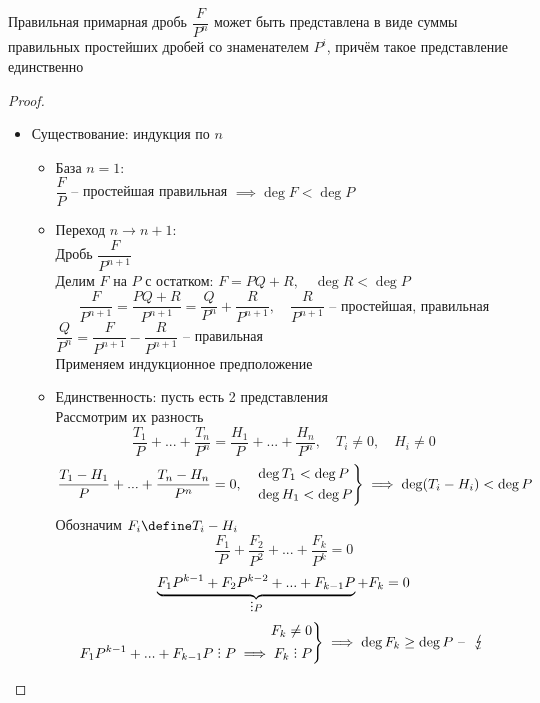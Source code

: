 \begin{lemma}
    Правильная примарная дробь $\dfrac{F}{P^n}$ может быть представлена в виде суммы правильных простейших дробей со знаменателем $P^i$, причём такое представление единственно
\end{lemma}

\begin{proof}
	\hfill
    \begin{itemize}
    	\item Существование: индукция по $n$
        \begin{itemize}
        	\item База $n = 1$: \\
            $\dfrac{F}P$ -- простейшая правильная $\implies \deg F < \deg P$
            \item Переход $n \to n + 1$: \\
            Дробь $\dfrac{F}{P^{n + 1}}$ \\
            Делим $F$ на $P$ с остатком: $F = PQ + R, \quad \deg R < \deg P$
            $$ \frac{F}{P^{n + 1}} = \frac{PQ + R}{P^{n + 1}} = \frac{Q}{P^n} + \frac{R}{P^{n + 1}}, \quad \frac{R}{P^{n + 1}} \text{ -- простейшая, правильная} $$
            $ \dfrac{Q}{P^n} = \dfrac{F}{P^{n + 1}} - \dfrac{R}{P^{n + 1}}$ -- правильная \\
            Применяем индукционное предположение
            \item Единственность: пусть есть 2 представления \\
            Рассмотрим их разность
            $$ \frac{T_1}P + ... + \frac{T_n}{P^n} = \frac{H_1}{P} + ... + \frac{H_n}{P^n}, \quad T_i \ne 0, \quad H_i \ne 0 $$
            $$ \frac{T_1 - H_1}P + ... + \frac{T_n - H_n}{P^n} = 0, \quad
            \begin{rcases}
            	\deg T_1 < \deg P \\
                \deg H_1 < \deg P
            \end{rcases} \implies \deg(T_i - H_i) < \deg P $$
            Обозначим $F_i \define T_i - H_i$
            $$ \frac{F_1}P + \frac{F_2}{P^2} + ... + \frac{F_k}{P^k} = 0 $$
            $$ \underbrace{F_1P^{k - 1} + F_2P^{k - 2} + ... + F_{k - 1}P}_{\divby P} + F_k = 0 $$
            $$ \left.
            \begin{aligned}
               	F_k \ne 0 \\
                F_1P^{k - 1} + ... + F_{k - 1}P \divby P \implies F_k \divby P
            \end{aligned} \right\} \implies \deg F_k \ge \deg P \text{ -- } \contra $$
        \end{itemize}
    \end{itemize}
\end{proof}

